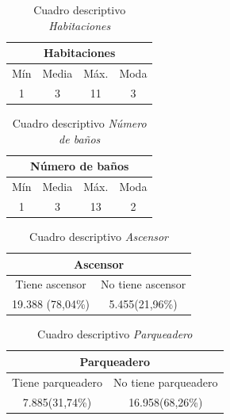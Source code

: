 \documentclass[conference, 10pt]{IEEEtran}
\begin{document}
\begin{table}[htbp]
\caption{Cuadro descriptivo \textit{Habitaciones}}
\begin{center}
\begin{tabular}{|c|c|c|c|}
\hline
\multicolumn{4}{|c|}{\textbf{Habitaciones}} \\
\cline{1-4} 
\hline
 Mín&Media&Máx.&Moda\\
\hline
 1&3&11&3\\
 	\hline
\end{tabular}
\label{tab_3}
\end{center}
\end{table}

\begin{table}[htbp]
\caption{Cuadro descriptivo \textit{Número de baños}}
\begin{center}
\begin{tabular}{|c|c|c|c|}
\hline
\multicolumn{4}{|c|}{\textbf{Número de baños}} \\
\cline{1-4} 
\hline
 Mín&Media&Máx.&Moda\\
\hline
 1&3&13&2\\
 	\hline
\end{tabular}
\label{tab_4}
\end{center}
\end{table}

\begin{table}[htbp]
\caption{Cuadro descriptivo \textit{Ascensor}}
\begin{center}
\begin{tabular}{|c|c|}
\hline
\multicolumn{2}{|c|}{\textbf{Ascensor}} \\
\cline{1-2} 
\hline
 Tiene ascensor&No tiene ascensor\\
 19.388 (78,04\%)&5.455(21,96\%)\\
  
	\hline
\end{tabular}
\label{tab_5}
\end{center}
\end{table}

\begin{table}[htbp]
\caption{Cuadro descriptivo \textit{Parqueadero}}
\begin{center}
\begin{tabular}{|c|c|}
\hline
\multicolumn{2}{|c|}{\textbf{Parqueadero}} \\
\cline{1-2} 
\hline
 Tiene parqueadero&No tiene parqueadero\\
 7.885(31,74\%)&16.958(68,26\%)\\
  
	\hline
\end{tabular}
\label{tab_6}
\end{center}
\end{table}
\end{document}
